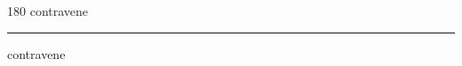 
\begin{frame}
\begin{center}
\begin{turn}{180}
{\fontsize{2.5cm}{1em}\selectfont contravene}
\end{turn}
\vspace{1em}\par  
\hrule
\vspace{1em}\par  
{\fontsize{2.5cm}{1em}\selectfont contravene}
\end{center}
\end{frame}
